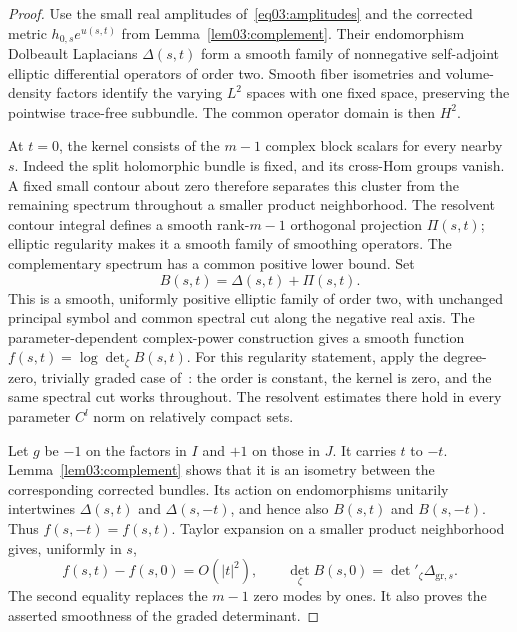 \documentclass[11pt]{amsart}
\theoremstyle{definition}
\theoremstyle{remark}
\begin{document}
\begin{proof}
Use the small real amplitudes of~\eqref{eq03:amplitudes} and
the corrected metric \(h_{0,s}e^{u(s,t)}\) from
Lemma~\ref{lem03:complement}. Their endomorphism Dolbeault
Laplacians \(\Delta(s,t)\) form a smooth family of nonnegative
self-adjoint elliptic differential operators of order two.
Smooth fiber isometries and volume-density factors identify the
varying \(L^2\) spaces with one fixed space, preserving the
pointwise trace-free subbundle. The common operator domain is
then \(H^2\).

At \(t=0\), the kernel consists of the \(m-1\) complex block
scalars for every nearby \(s\). Indeed the split holomorphic
bundle is fixed, and its cross-Hom groups vanish. A fixed small
contour about zero therefore separates this cluster from the
remaining spectrum throughout a smaller product neighborhood.
The resolvent contour integral defines a smooth rank-\(m-1\)
orthogonal projection \(\Pi(s,t)\); elliptic regularity makes
it a smooth family of smoothing operators. The complementary
spectrum has a common positive lower bound. Set
\[
 B(s,t)=\Delta(s,t)+\Pi(s,t).
\]
This is a smooth, uniformly positive elliptic family of order two,
with unchanged principal symbol and common spectral cut along
the negative real axis. The parameter-dependent complex-power
construction gives a smooth function
\(f(s,t)=\log\det_\zeta B(s,t)\).
For this regularity statement, apply the degree-zero,
trivially graded case of~\cite[\S2, Lemma 0.3]{scott2007}:
the order is constant, the kernel is zero, and the same spectral
cut works throughout. The resolvent estimates there hold in
every parameter \(C^l\) norm on relatively compact sets.

Let \(g\) be \(-1\) on the factors in \(I\) and \(+1\)
on those in \(J\). It carries \(t\) to \(-t\).
Lemma~\ref{lem03:complement} shows that it is an isometry
between the corresponding corrected bundles. Its action on
endomorphisms unitarily intertwines \(\Delta(s,t)\) and
\(\Delta(s,-t)\), and hence also \(B(s,t)\) and
\(B(s,-t)\). Thus \(f(s,-t)=f(s,t)\). Taylor expansion on a
smaller product neighborhood gives, uniformly in \(s\),
\[
 f(s,t)-f(s,0)=O(|t|^2),\qquad
 \det_\zeta B(s,0)=\det'_\zeta\Delta_{\mathrm{gr},s}.
\]
The second equality replaces the \(m-1\) zero modes by ones.
It also proves the asserted smoothness of the graded determinant.


\end{proof}
\end{document}
